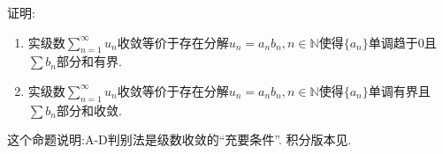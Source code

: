 \documentclass[../../main.tex]{subfiles}%
\begin{document}
\begin{proposition}\label{proposition:A-D判别法是级数收敛的“充要条件”}
证明:
\begin{enumerate}
\item 实级数$\sum_{n=1}^\infty u_n$收敛等价于存在分解$u_n=a_nb_n,n\in \mathbb{N}$使得$\{a_n\}$单调趋于$0$且$\sum b_n$部分和有界.

\item 实级数$\sum_{n=1}^\infty u_n$收敛等价于存在分解$u_n=a_nb_n,n\in \mathbb{N}$使得$\{a_n\}$单调有界且$\sum b_n$部分和收敛.
\end{enumerate}
\end{proposition}
\begin{note}
这个命题说明:A-D判别法是级数收敛的“充要条件”.
积分版本见.
\end{note}
\end{document}
